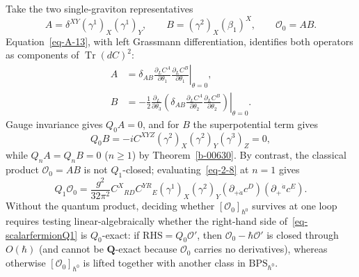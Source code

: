 \documentclass[11pt]{article}
\numberwithin{equation}{section}
\numberwithin{figure}{section}
\numberwithin{table}{section}
\begin{document}
Take the two single-graviton representatives
\begin{equation}\label{eq-gravitoninputs}
A=\delta^{XY}(\gamma^1)_X(\gamma^1)_Y,
\qquad B=(\gamma^2)_X(\beta_1)^X,
\qquad\mathcal O_0=AB.
\end{equation}
Equation~\eqref{eq-A-13}, with left Grassmann differentiation, identifies both operators as components of $\operatorname{Tr}(dC)^2$:
\begin{equation}\label{local-ch8-graviton-component-extraction}
\begin{aligned}
A&=\left.\delta_{AB}\frac{\partial_L C^A}{\partial\theta_1}
\frac{\partial_L C^B}{\partial\theta_1}\right|_{\theta=0},\\
B&=-\frac12\left.\frac{\partial_L}{\partial\theta_3}
\left(\delta_{AB}\frac{\partial_L C^A}{\partial\theta_2}
\frac{\partial_L C^B}{\partial\theta_2}\right)\right|_{\theta=0}.
\end{aligned}
\end{equation}
Gauge invariance gives $Q_0A=0$, and for $B$ the superpotential term gives
\begin{equation}\label{b-00658}
Q_0B=-iC^{XYZ}(\gamma^2)_X(\gamma^2)_Y(\gamma^3)_Z=0,
\end{equation}
while $Q_nA=Q_nB=0$ ($n\ge1$) by Theorem~\ref{b-00630}. By contrast, the classical product $\mathcal O_0=AB$ is not $Q_1$-closed; evaluating~\eqref{eq-2-8} at $n=1$ gives
\begin{equation}\label{eq-scalarfermionQ1}
Q_1\mathcal O_0
=\frac{g^2}{32\pi^2}
C^X{}_{RD}C^{YR}{}_E
(\gamma^1)_X(\gamma^2)_Y
(\partial_{+\dot a}c^D)(\partial_+{}^{\dot a}c^E).
\end{equation}
Without the quantum product, deciding whether $[\mathcal O_0]_{\hbar^0}$ survives at one loop requires testing linear-algebraically whether the right-hand side of~\eqref{eq-scalarfermionQ1} is $Q_0$-exact: if $\mathrm{RHS}=Q_0\mathcal O'$, then $\mathcal O_0-\hbar\mathcal O'$ is closed through $O(\hbar)$ (and cannot be $\mathbf Q$-exact because $\mathcal O_0$ carries no derivatives), whereas otherwise $[\mathcal O_0]_{\hbar^0}$ is lifted together with another class in $\mathrm{BPS}_{\hbar^0}$.
\end{document}
